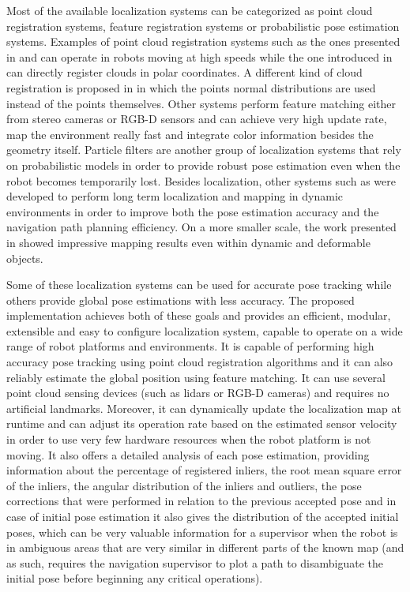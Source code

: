 Most of the available localization systems can be categorized as point cloud registration systems, feature registration systems or probabilistic pose estimation systems. Examples of point cloud registration systems such as the ones presented in \cite{Lingemann2005} and \cite{Pomerleau2013} can operate in robots moving at high speeds while the one introduced in \cite{Diosi2005} can directly register clouds in polar coordinates. A different kind of cloud registration is proposed in \cite{Magnusson2009} in which the points normal distributions are used instead of the points themselves. Other systems perform feature matching either from stereo cameras \cite{Kitt2010} or RGB-D sensors \cite{Labb2014} and can achieve very high update rate, map the environment really fast and integrate color information besides the geometry itself. Particle filters \cite{Fox2003,Thrun2002} are another group of localization systems that rely on probabilistic models in order to provide robust pose estimation even when the robot becomes temporarily lost. Besides localization, other systems such as \cite{Grisetti2007,Kaess2008,Tipaldi2013,Kerl,Stuckler2012} were developed to perform long term localization and mapping in dynamic environments in order to improve both the pose estimation accuracy and the navigation path planning efficiency. On a more smaller scale, the work presented in \cite{Newcombe} showed impressive mapping results even within dynamic and deformable objects.

Some of these localization systems can be used for accurate pose tracking while others provide global pose estimations with less accuracy. The proposed implementation achieves both of these goals and provides an efficient, modular, extensible and easy to configure localization system, capable to operate on a wide range of robot platforms and environments. It is capable of performing high accuracy pose tracking using point cloud registration algorithms and it can also reliably estimate the global position using feature matching. It can use several point cloud sensing devices (such as \glspl{lidar} or RGB-D cameras) and requires no artificial landmarks. Moreover, it can dynamically update the localization map at runtime and can adjust its operation rate based on the estimated sensor velocity in order to use very few hardware resources when the robot platform is not moving. It also offers a detailed analysis of each pose estimation, providing information about the percentage of registered inliers, the root mean square error of the inliers, the angular distribution of the inliers and outliers, the pose corrections that were performed in relation to the previous accepted pose and in case of initial pose estimation it also gives the distribution of the accepted initial poses, which can be very valuable information for a supervisor when the robot is in ambiguous areas that are very similar in different parts of the known map (and as such, requires the navigation supervisor to plot a path to disambiguate the initial pose before beginning any critical operations).

